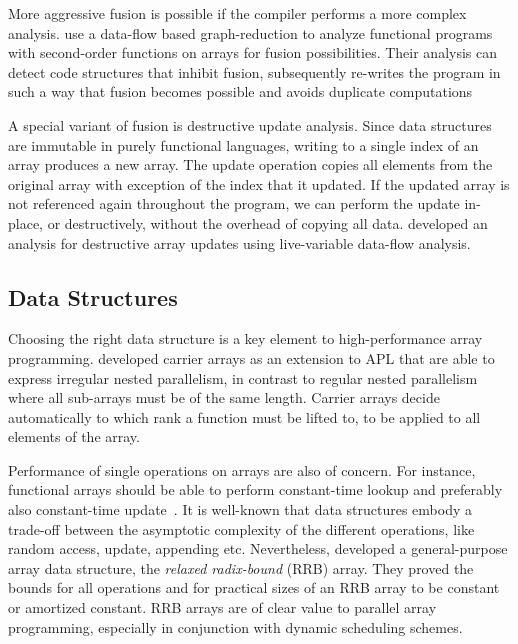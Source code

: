 \documentclass[a4paper]{article}
\begin{document}
More aggressive fusion is possible if the compiler performs a more complex analysis. \citet{Henriksen:2013:TGA:2502323.2502328} use a data-flow based graph-reduction to analyze functional programs with second-order functions on arrays for fusion possibilities. Their analysis can detect code structures that inhibit fusion, subsequently re-writes the program in such a way that fusion becomes possible and avoids duplicate computations

A special variant of fusion is destructive update analysis. Since data structures are immutable in purely functional languages, writing to a single index of an array produces a new array. The update operation copies all elements from the original array with exception of the index that it updated. If the updated array is not referenced again throughout the program, we can perform the update in-place, or destructively, without the overhead of copying all data. \citet{Sastry:1994:PDU:182409.182486} developed an analysis for destructive array updates using live-variable data-flow analysis.

\subsection{Data Structures}
\label{sec:data-structures}

Choosing the right data structure is a key element to high-performance array programming. \citet{Lowney:1981:CAI:567532.567533} developed carrier arrays as an extension to APL that are able to express irregular nested parallelism, in contrast to regular nested parallelism where all sub-arrays must be of the same length. Carrier arrays decide automatically to which rank a function must be lifted to, to be applied to all elements of the array.

Performance of single operations on arrays are also of concern. For instance, functional arrays should be able to perform constant-time lookup and preferably also constant-time update~\cite{47507}. It is well-known that data structures embody a trade-off between the asymptotic complexity of the different operations, like random access, update, appending etc. Nevertheless, \citet{Stucki:2015:RVP:2784731.2784739} developed a general-purpose array data structure, the \textit{relaxed radix-bound} (RRB) array. They proved the bounds for all operations and for practical sizes of an RRB array to be constant or amortized constant. RRB arrays are of clear value to parallel array programming, especially in conjunction with dynamic scheduling schemes.
\end{document}
